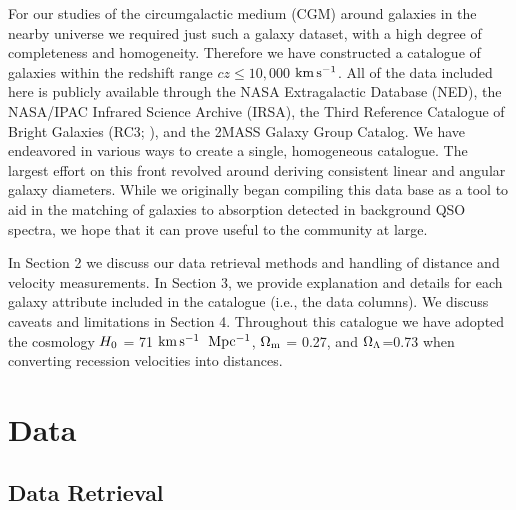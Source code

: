 \documentclass[twocolumn,tighten]{aastex62}
\newcommand{\kms}{$\rm km\, s^{-1}$}
\begin{document}

For our studies of the circumgalactic medium (CGM) around galaxies in the nearby universe we required just such a galaxy dataset, with a high degree of completeness and homogeneity. Therefore we have constructed a catalogue of galaxies within the redshift range $cz \leq 10,000$ \kms. All of the data included here is publicly available through the NASA Extragalactic Database (NED), the NASA/IPAC Infrared Science Archive (IRSA), the Third Reference Catalogue of Bright Galaxies (RC3; \citealt{RC3}), and the \cite{tully2015} 2MASS Galaxy Group Catalog. We have endeavored in various ways to create a single, homogeneous catalogue. The largest effort on this front revolved around deriving consistent linear and angular galaxy diameters. While we originally began compiling this data base as a tool to aid in the matching of galaxies to absorption detected in background QSO spectra,  we hope that it can prove useful to the community at large. 


%
%

In Section 2 we discuss our data retrieval methods and handling of distance and velocity measurements. In Section 3, we provide explanation and details for each galaxy attribute included in the catalogue (i.e., the data columns). We discuss caveats and limitations in Section 4. Throughout this catalogue we have adopted the cosmology $H_{\rm 0}$ = 71 \kms ~$\rm Mpc^{-1}$, $\rm \Omega_m$ = 0.27, and $\rm \Omega_{\Lambda}$=0.73 when converting recession velocities into distances.

\section{Data}

\subsection{Data Retrieval}
\end{document}
